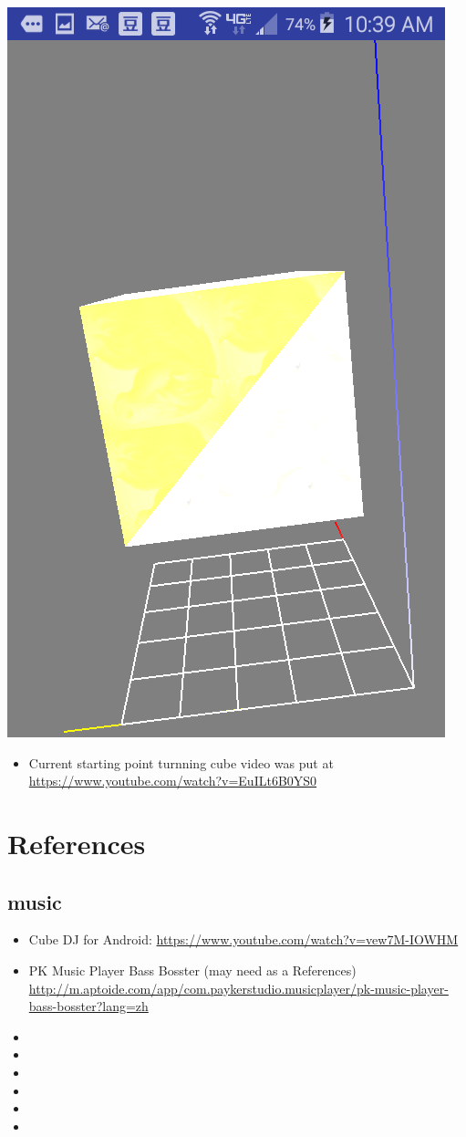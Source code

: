 \documentclass[9pt,b5paper]{article}
\begin{document}
\includegraphics[width=.9\linewidth]{./Screenshot_2016-04-30-10-39-54.png}
\begin{itemize}
\item Current starting point turnning cube video was put at \url{https://www.youtube.com/watch?v=EuILt6B0YS0}
\end{itemize}

\section{References}
\label{sec-2}
\subsection{music}
\label{sec-2-1}
\begin{itemize}
\item Cube DJ for Android: \url{https://www.youtube.com/watch?v=vew7M-IOWHM}
\item PK Music Player Bass Bosster (may need as a References) \url{http://m.aptoide.com/app/com.paykerstudio.musicplayer/pk-music-player-bass-bosster?lang=zh}
\item 
\item 
\item 
\item 
\item 
\item 
\end{itemize}
\end{document}
